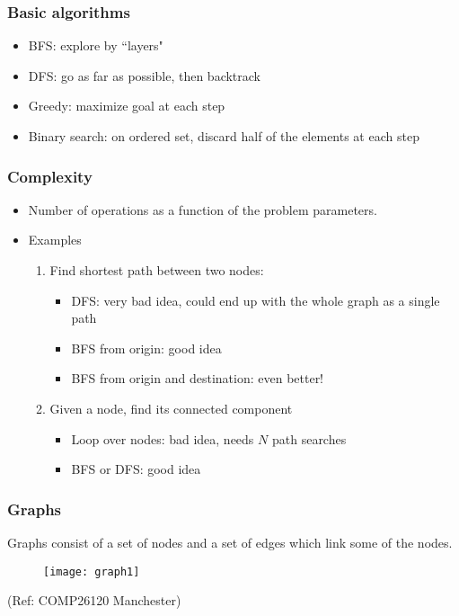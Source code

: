    \begin{frame}[fragile]
\frametitle{Basic algorithms}
\begin{itemize}
\item BFS: explore by ``layers"
\item DFS: go as far as possible, then backtrack
\item Greedy: maximize goal at each step
\item Binary search: on ordered set, discard half of the elements at each step
\end{itemize}
\end{frame}

   \begin{frame}[fragile]
\frametitle{Complexity}
\begin{itemize}
\item Number of operations as a function of the problem parameters.
\item Examples
\begin{enumerate}
\item Find shortest path between two nodes:
\begin{itemize}
\item DFS: very bad idea, could end up with the whole graph as a single path
\item BFS from origin: good idea
\item BFS from origin and destination: even better!
\end{itemize}
\item Given a node, find its connected component
\begin{itemize}
\item Loop over nodes: bad idea, needs $N$ path searches
\item BFS or DFS: good idea
\end{itemize}
\end{enumerate}
\end{itemize}
\end{frame}



   \begin{frame}[fragile]
\frametitle{Graphs}
Graphs consist of a set of \color{red}nodes \color{black} and a set of 
\color{red}edges \color{black} which link some of the nodes.

    \begin{figure} [ht]
    \centering
    \texttt{[image: graph1]}
    \end{figure}
    
(Ref: COMP26120 Manchester)
\end{frame}

